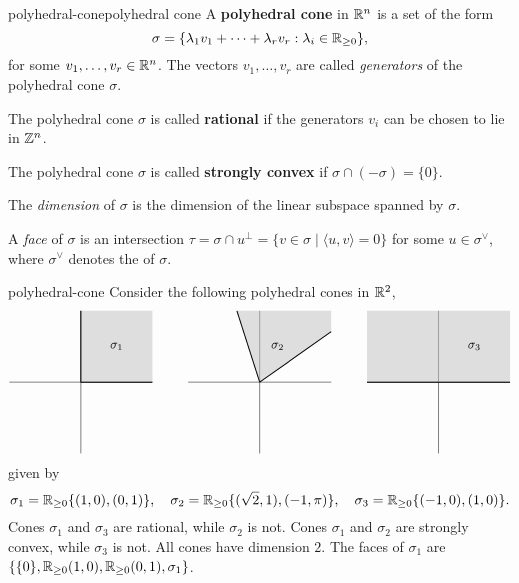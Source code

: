 \begin{topic}{polyhedral-cone}{polyhedral cone}
    A \textbf{polyhedral cone} in $\mathbb{R}^n$ is a set of the form
    \[ \sigma = \{ \lambda_1 v_1 + \cdots + \lambda_r v_r : \lambda_i \in \mathbb{R}_{\ge 0} \} , \]
    for some $v_1, \ldots, v_r \in \mathbb{R}^n$. The vectors $v_1, \ldots, v_r$ are called \textit{generators} of the polyhedral cone $\sigma$.
    
    The polyhedral cone $\sigma$ is called \textbf{rational} if the generators $v_i$ can be chosen to lie in $\mathbb{Z}^n$.
    
    The polyhedral cone $\sigma$ is called \textbf{strongly convex} if $\sigma \cap (-\sigma) = \{ 0 \}$.
    
    The \textit{dimension} of $\sigma$ is the dimension of the linear subspace spanned by $\sigma$.
    
    A \textit{face} of $\sigma$ is an intersection $\tau = \sigma \cap u^\perp = \{ v \in \sigma \;|\; \langle u, v \rangle = 0 \}$ for some $u \in \sigma^\vee$, where $\sigma^\vee$ denotes the  of $\sigma$.
\end{topic}

\begin{example}{polyhedral-cone}
    Consider the following polyhedral cones in $\mathbb{R}^2$,
    \[ \begin{tikzpicture}
        \begin{scope}[shift={(-5,0)}]
            \draw (-2, 0) -- (2, 0);
            \draw (0, -2) -- (0, 2);
            \fill[fill=gray!50, opacity=0.5] (0, 0) -- (0, 2) -- (2, 2) -- (2, 0);
            \draw[thick] (0, 0) -- (2, 0);
            \draw[thick] (0, 0) -- (0, 2);
            \node at (1, 1) {$\sigma_1$};
        \end{scope}
        \begin{scope}
            \draw (-2, 0) -- (2, 0);
            \draw (0, -2) -- (0, 2);
            \fill[fill=gray!50, opacity=0.5] (0, 0) -- (2, 1.4142135) -- (2, 2) -- (-0.63661977, 2);
            \draw[thick] (0, 0) -- (2, 1.4142135);
            \draw[thick] (0, 0) -- (-0.63661977, 2);
            \node at (0.5, 1) {$\sigma_2$};
        \end{scope}
        \begin{scope}[shift={(5,0)}]
            \draw (-2, 0) -- (2, 0);
            \draw (0, -2) -- (0, 2);
            \fill[fill=gray!50, opacity=0.5] (-2, 0) -- (2, 0) -- (2, 2) -- (-2, 2);
            \draw[thick] (0, 0) -- (2, 0);
            \draw[thick] (0, 0) -- (-2, 0);
            \node at (1, 1) {$\sigma_3$};
        \end{scope}
    \end{tikzpicture} \]
    given by
    \[ \sigma_1 = \mathbb{R}_{\ge 0} \{ (1, 0), (0, 1) \}, \quad \sigma_2 = \mathbb{R}_{\ge 0} \{ (\sqrt{2}, 1), (-1, \pi) \}, \quad \sigma_3 = \mathbb{R}_{\ge 0} \{ (-1, 0), (1, 0) \} .  \]
    Cones $\sigma_1$ and $\sigma_3$ are rational, while $\sigma_2$ is not. Cones $\sigma_1$ and $\sigma_2$ are strongly convex, while $\sigma_3$ is not. All cones have dimension $2$. The faces of $\sigma_1$ are $\{ \{ 0 \}, \mathbb{R}_{\ge 0} (1, 0), \mathbb{R}_{\ge 0} (0, 1), \sigma_1 \}$.
\end{example}

